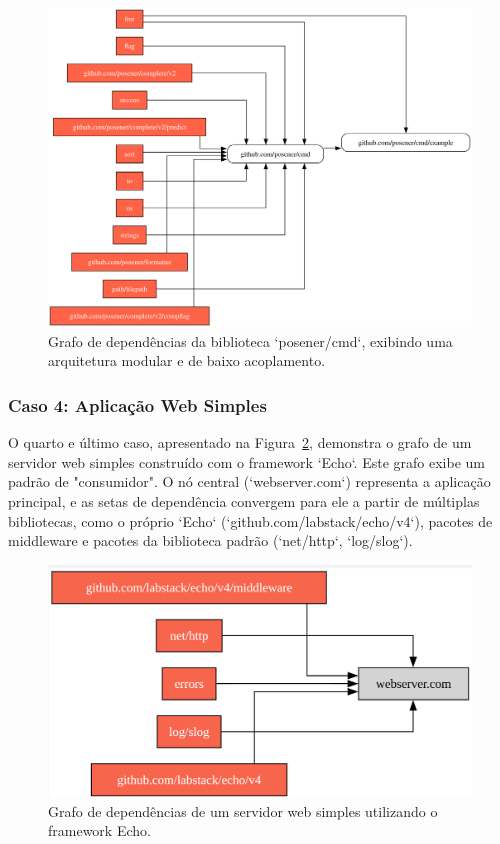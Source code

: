 \documentclass[12pt]{article}
\begin{document}
\begin{figure}[htbp]
\centering
\includegraphics[width=.8\textwidth]{examples/github.com_posener_cmd.png}
\caption{Grafo de dependências da biblioteca `posener/cmd`, exibindo uma arquitetura modular e de baixo acoplamento.}
\label{fig:exemplo-3}
\end{figure}

\subsubsection{Caso 4: Aplicação Web Simples}
O quarto e último caso, apresentado na Figura~\ref{fig:exemplo-4}, demonstra o grafo de um servidor web simples construído com o framework `Echo`. Este grafo exibe um padrão de "consumidor". O nó central (`webserver.com`) representa a aplicação principal, e as setas de dependência convergem para ele a partir de múltiplas bibliotecas, como o próprio `Echo` (`github.com/labstack/echo/v4`), pacotes de middleware e pacotes da biblioteca padrão (`net/http`, `log/slog`).

\begin{figure}[htbp]
\centering
\includegraphics[width=.8\textwidth]{examples/webserver.png}
\caption{Grafo de dependências de um servidor web simples utilizando o framework Echo.}
\label{fig:exemplo-4}
\end{figure}
\end{document}

